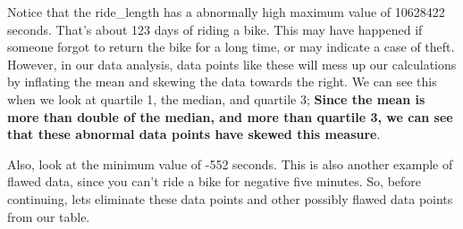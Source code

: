 \documentclass[
]{article}
\newenvironment{Shaded}{\begin{snugshade}}{\end{snugshade}}
\newcommand{\CommentTok}[1]{\textcolor[rgb]{0.56,0.35,0.01}{\textit{#1}}}
\newcommand{\DecValTok}[1]{\textcolor[rgb]{0.00,0.00,0.81}{#1}}
\newcommand{\DocumentationTok}[1]{\textcolor[rgb]{0.56,0.35,0.01}{\textbf{\textit{#1}}}}
\newcommand{\FunctionTok}[1]{\textcolor[rgb]{0.13,0.29,0.53}{\textbf{#1}}}
\newcommand{\NormalTok}[1]{#1}
\newcommand{\OtherTok}[1]{\textcolor[rgb]{0.56,0.35,0.01}{#1}}
\newcommand{\SpecialCharTok}[1]{\textcolor[rgb]{0.81,0.36,0.00}{\textbf{#1}}}
\newcommand{\StringTok}[1]{\textcolor[rgb]{0.31,0.60,0.02}{#1}}
\begin{document}
Notice that the ride\_length has a abnormally high maximum value of
10628422 seconds. That's about 123 days of riding a bike. This may have
happened if someone forgot to return the bike for a long time, or may
indicate a case of theft. However, in our data analysis, data points
like these will mess up our calculations by inflating the mean and
skewing the data towards the right. We can see this when we look at
quartile 1, the median, and quartile 3; \textbf{Since the mean is more
than double of the median, and more than quartile 3, we can see that
these abnormal data points have skewed this measure}.

Also, look at the minimum value of -552 seconds. This is also another
example of flawed data, since you can't ride a bike for negative five
minutes. So, before continuing, lets eliminate these data points and
other possibly flawed data points from our table.

\begin{Shaded}
\end{Shaded}
\end{document}
